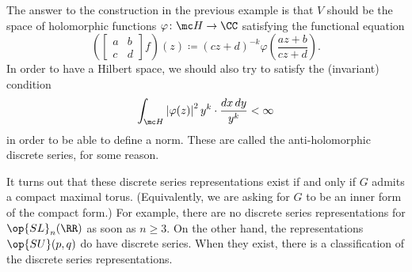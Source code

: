 \documentclass[../notes.tex]{subfiles}
\begin{document}
The answer to the construction in the previous example is that $V$ should be the space of holomorphic functions $\varphi\colon\mc H\to\CC$ satisfying the functional equation
\[\left(\begin{bmatrix}
	a & b \\ c & d
\end{bmatrix}f\right)(z)\coloneqq(cz+d)^{-k}\varphi\left(\frac{az+b}{cz+d}\right).\]
In order to have a Hilbert space, we should also try to satisfy the (invariant) condition
\[\int_{\mc H}\left|\varphi(z)\right|^2y^k\cdot\frac{dx\,dy}{y^k}<\infty\]
in order to be able to define a norm. These are called the anti-holomorphic discrete series, for some reason.
\begin{remark}
	It turns out that these discrete series representations exist if and only if $G$ admits a compact maximal torus. (Equivalently, we are asking for $G$ to be an inner form of the compact form.) For example, there are no discrete series representations for $\op{SL}_n(\RR)$ as soon as $n\ge3$. On the other hand, the representations $\op{SU}(p,q)$ do have discrete series. When they exist, there is a classification of the discrete series representations.
\end{remark}
\end{document}
